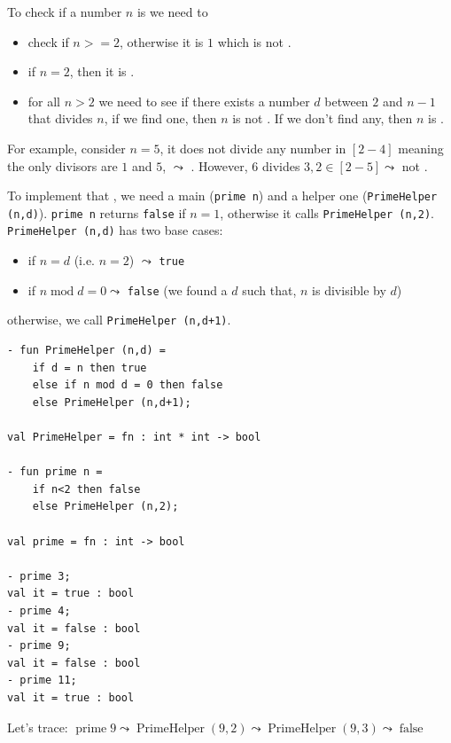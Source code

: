 
To check if a number $n$ is  we need to 
\begin{itemize}
    \item check if $n>=2$, otherwise it is $1$ which is not .
    \item if $n=2$, then it is .
    \item for all $n>2$ we need to see if there exists a number $d$ between $2$ and $n-1$ that divides $n$, if we find one, then $n$ is not . If we don't find any, then $n$ is .
\end{itemize}
For example, consider $n=5$, it does not divide any number in $[2 - 4]$ meaning the only divisors are $1$ and $5$, $\leadsto$ . However, $6$ divides $3,2 \in [2-5] \leadsto$ not .

To implement that , we need a main  (\texttt{prime n}) and a helper one (\texttt{PrimeHelper (n,d)}).  \texttt{prime n} returns \texttt{false} if $n=1$, otherwise it calls  \texttt{PrimeHelper (n,2)}. \texttt{PrimeHelper (n,d)} has two base cases:
\begin{itemize}
    \item if $n=d$ (i.e. $n=2$) $\leadsto$ \texttt{true}
    \item if $n \operatorname{mod} d = 0 \leadsto$  \texttt{false} (we found a $d$ such that, $n$ is divisible by $d$)
\end{itemize}
otherwise, we  call \texttt{PrimeHelper (n,d+1)}.


\begin{verbatim}
- fun PrimeHelper (n,d) =
    if d = n then true
    else if n mod d = 0 then false
    else PrimeHelper (n,d+1);

val PrimeHelper = fn : int * int -> bool

- fun prime n =
    if n<2 then false
    else PrimeHelper (n,2);

val prime = fn : int -> bool

- prime 3;
val it = true : bool
- prime 4;
val it = false : bool
- prime 9;
val it = false : bool
- prime 11;
val it = true : bool
\end{verbatim}
Let's trace:
$\operatorname{prime} 9 \leadsto \operatorname{PrimeHelper}(9, 2) \leadsto \operatorname{PrimeHelper}(9, 3) \leadsto \operatorname{false}$

